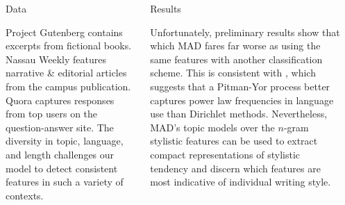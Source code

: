 \documentclass[final]{beamer}
\newlength{\sepwid}
\newlength{\onecolwid}
\newlength{\twocolwid}
\begin{document}
\begin{frame}[t]
\begin{columns}[t]
\begin{column}{\twocolwid}
\begin{columns}[t,totalwidth=\twocolwid]
\begin{column}{\onecolwid}
\begin{block}{Data}
\vspace{10 mm}

Project Gutenberg contains excerpts from fictional books. Nassau Weekly features narrative \& editorial articles from the campus publication. Quora captures responses from top users on the question-answer site. The diversity in topic, language, and length challenges our model to detect consistent features in such a variety of contexts.

\end{block}


\end{column} %

\begin{column}{\onecolwid} %


\begin{block}{Results}


\small
\indent Unfortunately, preliminary results show that which MAD fares far worse as using the same features with another classification scheme. This is consistent with \cite{...}, which suggests that a Pitman-Yor process better captures power law frequencies in language use than Dirichlet methods. Nevertheless, MAD's topic models over the $n$-gram stylistic features can be used to extract compact representations of stylistic tendency and discern which features are most indicative of individual writing style.

\end{block}


\end{column} %

\end{columns} %

\end{column} %

\begin{column}{\sepwid}\end{column} %


\end{columns}
\end{frame}
\end{document}
